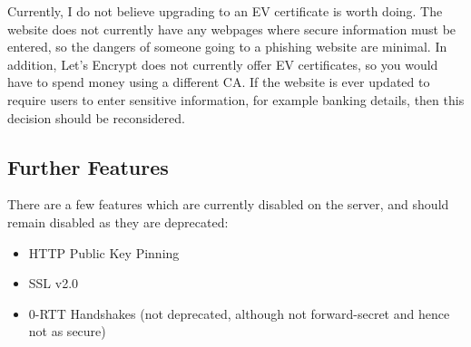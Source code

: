 \documentclass[12pt]{article}
\begin{document}
  Currently, I do not believe upgrading to an EV certificate is worth doing.
  The website does not currently have any webpages where secure information must be entered, so the dangers of someone going to a phishing website are minimal.
  In addition, Let's Encrypt does not currently offer EV certificates, so you would have to spend money using a different CA.
  If the website is ever updated to require users to enter sensitive information, for example banking details, then this decision should be reconsidered.


  \subsection{Further Features}
  There are a few features which are currently disabled on the server, and should remain disabled as they are deprecated:
  \begin{itemize}
    \item HTTP Public Key Pinning
    \item SSL v2.0
    \item 0-RTT Handshakes (not deprecated, although not forward-secret and hence not as secure)
  \end{itemize}
\end{document}
